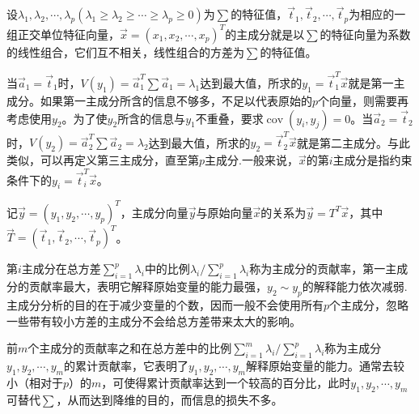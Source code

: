设${{\lambda }_{1}},{{\lambda }_{2}},\cdots ,{{\lambda }_{p}}\left( {{\lambda }_{1}}\ge {{\lambda }_{2}}\ge \cdots \ge {{\lambda }_{p}}\ge 0 \right)$为$\sum $的特征值，${{\overrightarrow{t}}_{1}},{{\overrightarrow{t}}_{2}},\cdots ,{{\overrightarrow{t}}_{p}}$为相应的一组正交单位特征向量，$\overrightarrow{x}={{\left( {{x}_{1}},{{x}_{2}},\cdots ,{{x}_{p}} \right)}^{T}}$的主成分就是以$\sum $的特征向量为系数的线性组合，它们互不相关，线性组合的方差为$\sum $的特征值。

当${{\overrightarrow{a}}_{1}}={{\overrightarrow{t}}_{1}}$时，$V\left( {{y}_{1}} \right)=\overrightarrow{a}_{1}^{T}\sum {{\overrightarrow{a}}_{1}}={{\lambda }_{1}}$达到最大值，所求的${{y}_{1}}=\overrightarrow{t}_{1}^{T}\overrightarrow{x}$就是第一主成分。如果第一主成分所含的信息不够多，不足以代表原始的$p$个向量，则需要再考虑使用${{y}_{2}}$。为了使${{y}_{2}}$所含的信息与${{y}_{1}}$不重叠，要求$\operatorname{cov}\left( {{y}_{i}},{{y}_{j}} \right)=0$。当${{\overrightarrow{a}}_{2}}={{\overrightarrow{t}}_{2}}$时，$V\left( {{y}_{2}} \right)=\overrightarrow{a}_{2}^{T}\sum {{\overrightarrow{a}}_{2}}={{\lambda }_{2}}$达到最大值，所求的${{y}_{2}}=\overrightarrow{t}_{2}^{T}\overrightarrow{x}$就是第二主成分。与此类似，可以再定义第三主成分，直至第$p$主成分.一般来说，$\overrightarrow{x}$的第$i$主成分是指约束条件下的${{y}_{i}}=\overrightarrow{t}_{i}^{T}\overrightarrow{x}$。

记$\overrightarrow{y}={{\left( {{y}_{1}},{{y}_{2}},\cdots ,{{y}_{p}} \right)}^{T}}$，主成分向量$\overrightarrow{y}$与原始向量$\overrightarrow{x}$的关系为$\overrightarrow{y}={{T}^{T}}\overrightarrow{x}$，其中$\overrightarrow{T}={{\left( {{\overrightarrow{t}}_{1}},{{\overrightarrow{t}}_{2}},\cdots ,{{\overrightarrow{t}}_{p}} \right)}^{T}}$。

第$i$主成分在总方差$\sum\limits_{i=1}^{p}{{{\lambda }_{i}}}$中的比例${{\lambda }_{i}}/\sum\limits_{i=1}^{p}{{{\lambda }_{i}}}$称为主成分的贡献率，第一主成分的贡献率最大，表明它解释原始变量的能力最强，${{y}_{2}}\sim {{y}_{p}}$的解释能力依次减弱.主成分分析的目的在于减少变量的个数，因而一般不会使用所有$p$个主成分，忽略一些带有较小方差的主成分不会给总方差带来太大的影响。

前$m$个主成分的贡献率之和在总方差中的比例$\sum\limits_{i=1}^{m}{{{\lambda }_{i}}}/\sum\limits_{i=1}^{p}{{{\lambda }_{i}}}$称为主成分${{y}_{1}},{{y}_{2}},\cdots ,{{y}_{m}}$的累计贡献率，它表明了${{y}_{1}},{{y}_{2}},\cdots ,{{y}_{m}}$解释原始变量的能力。通常去较小（相对于$p$）的$m$，可使得累计贡献率达到一个较高的百分比，此时${{y}_{1}},{{y}_{2}},\cdots ,{{y}_{m}}$可替代$\sum $，从而达到降维的目的，而信息的损失不多。

